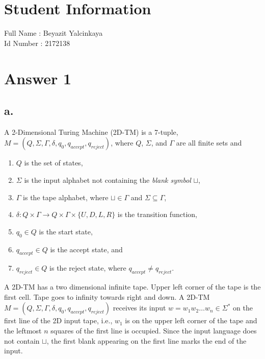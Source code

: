 \documentclass[12pt]{article}
\begin{document}
\section*{Student Information } 
Full Name : Beyazit Yalcinkaya  \\
Id Number : 2172138  \\

\section*{Answer 1}

\subsection*{a.} 

A 2-Dimensional Turing Machine (2D-TM) is a 7-tuple, $M = (Q, \Sigma, \Gamma, \delta, q_0, q_{accept}, q_{reject})$, where $Q$, $\Sigma$, and $\Gamma$ are all finite sets and

\begin{enumerate}
	\item $Q$ is the set of states,
	\item $\Sigma$ is the input alphabet not containing the \emph{blank symbol} $\sqcup$,
	\item $\Gamma$ is the tape alphabet, where $\sqcup \in \Gamma$ and $\Sigma \subseteq \Gamma$,
	\item $\delta: Q \times \Gamma \rightarrow Q \times \Gamma \times \{U, D, L, R\}$ is the transition function,
	\item $q_0 \in Q$ is the start state,
	\item $q_{accept} \in Q$ is the accept state, and
	\item $q_{reject} \in Q$ is the reject state, where $q_{accept} \neq q_{reject}$.
\end{enumerate}

A 2D-TM has a two dimensional infinite tape. Upper left corner of the tape is the first cell. Tape goes to infinity towards right and down. A 2D-TM $M = (Q, \Sigma, \Gamma, \delta, q_0, q_{accept}, q_{reject})$ receives its input $w = w_1 w_2 \ldots w_n \in \Sigma^*$ on the first line of the 2D input tape, i.e., $w_1$ is on the upper left corner of the tape and the leftmost $n$ squares of the first line is occupied. Since the input language does not contain $\sqcup$, the first blank appearing on the first line marks the end of the input.
\end{document}
